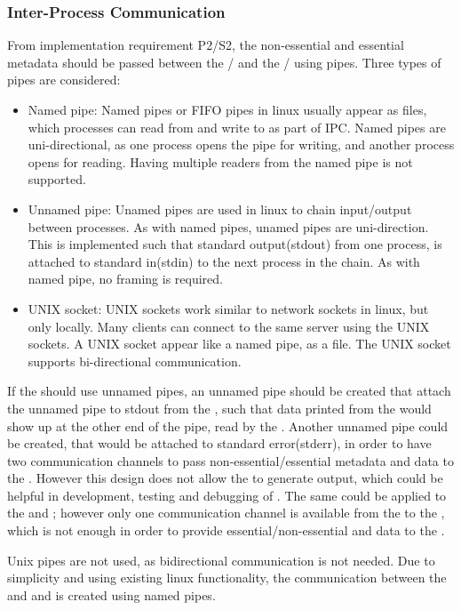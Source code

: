 \subsubsection{Inter-Process Communication} \label{sec:implementation:ipc}
From implementation requirement P2/S2, the non-essential and essential metadata should be passed between the \pub{}/\sub{} and the \con{}/\pro{} using pipes. Three types of pipes are considered:
\begin{itemize}
	\item Named pipe: Named pipes or FIFO pipes in linux usually appear as files, which processes can read from and write to as part of \ac{IPC}. Named pipes are uni-directional, as one process opens the pipe for writing, and another process opens for reading. Having multiple readers from the named pipe is not supported.
	
	\item Unnamed pipe: Unamed pipes are used in linux to chain input/output between processes. As with named pipes, unamed pipes are uni-direction. This is implemented such that standard output(stdout) from one process, is attached to standard in(stdin) to the next process in the chain. As with named pipe, no framing is required.
	
	\item UNIX socket: UNIX sockets work similar to network sockets in linux, but only locally. Many clients can connect to the same server using the UNIX sockets. A UNIX socket appear like a named pipe, as a file. The UNIX socket supports bi-directional communication. 
\end{itemize}

If the \pub{} should use unnamed pipes, an unnamed pipe should be created that attach the unnamed pipe to stdout from the \pro{}, such that data printed from the \pro{} would show up at the other end of the pipe, read by the \pub{}. Another unnamed pipe could be created, that would be attached to standard error(stderr), in order to have two communication channels to pass non-essential/essential metadata and data to the \pub{}. However this design does not allow the \pro{} to generate output, which could be helpful in development, testing and debugging of \cons{}. The same could be applied to the \sub{} and \con{}; however only one communication channel is available from the \sub{} to the \con{}, which is not enough in order to provide essential/non-essential and data to the \con{}.

Unix pipes are not used, as bidirectional communication is not needed. Due to simplicity and using existing linux functionality, the communication between the \pubs{} \subs{} and \con{} and \pro{} is created using named pipes.


